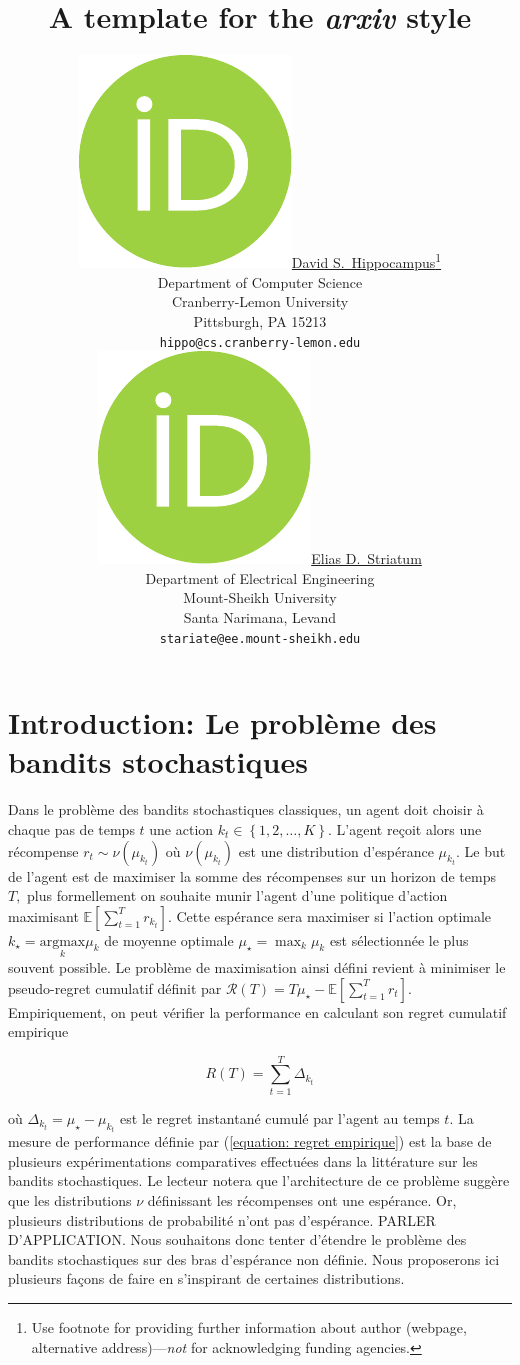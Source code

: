 \documentclass{article}
\title{A template for the \emph{arxiv} style}
\author{ \href{https://orcid.org/0000-0000-0000-0000}{\includegraphics[scale=0.06]{orcid.pdf}\hspace{1mm}David S.~Hippocampus}\thanks{Use footnote for providing further
		information about author (webpage, alternative
		address)---\emph{not} for acknowledging funding agencies.} \\
	Department of Computer Science\\
	Cranberry-Lemon University\\
	Pittsburgh, PA 15213 \\
	\texttt{hippo@cs.cranberry-lemon.edu} \\
	\And
	\href{https://orcid.org/0000-0000-0000-0000}{\includegraphics[scale=0.06]{orcid.pdf}\hspace{1mm}Elias D.~Striatum} \\
	Department of Electrical Engineering\\
	Mount-Sheikh University\\
	Santa Narimana, Levand \\
	\texttt{stariate@ee.mount-sheikh.edu} \\
}
\begin{document}
\maketitle

\begin{abstract}
	\lipsum[1]
\end{abstract}



\section{Introduction: Le problème des bandits stochastiques}
Dans le problème des bandits stochastiques classiques, un agent doit choisir à chaque pas de temps $t$ une action $k_t\in\left\{1,2,\ldots,K\right\}.$ L'agent reçoit alors une récompense $r_t\sim\nu(\mu_{k_t})$  où $\nu(\mu_{k_t})$ est une distribution d'espérance $\mu_{k_t}.$ Le but de l'agent est de maximiser la somme des récompenses sur un horizon de temps $T,$ plus formellement on souhaite munir l'agent d'une politique d'action maximisant $\displaystyle\mathbb{E}\left[\sum_{t=1}^T r_{k_t}\right].$ Cette espérance sera maximiser si l'action optimale $k_{\star}=\underset{k}{\mathrm{argmax}} \mu_k$ de moyenne optimale $\mu_{\star}=\max_k \mu_k$ est sélectionnée le plus souvent possible. Le problème de maximisation ainsi défini revient à minimiser le pseudo-regret cumulatif définit par $\displaystyle\mathcal{R}(T)=T\mu_{\star}-\mathbb{E}\left[\sum_{t=1}^T r_t\right].$ Empiriquement, on peut vérifier la performance en calculant son regret cumulatif empirique 

\begin{equation}
\label{equation: regret empirique}
R(T)=\sum_{t=1}^T\Delta_{k_t}
\end{equation}

où $\Delta_{k_t}=\mu_{\star}-\mu_{k_t}$ est le regret instantané cumulé par l'agent au temps $t.$ La mesure de performance définie par (\ref{equation: regret empirique}) est la base de plusieurs expérimentations comparatives effectuées dans la littérature sur les bandits stochastiques. Le lecteur notera que l'architecture de ce problème suggère que les distributions $\nu$ définissant les récompenses ont une espérance. Or, plusieurs distributions de probabilité n'ont pas d'espérance. PARLER D'APPLICATION. Nous souhaitons donc tenter d'étendre le problème des bandits stochastiques sur des bras d'espérance non définie. Nous proposerons ici plusieurs façons de faire en s'inspirant de certaines distributions.    
 
\end{document}

